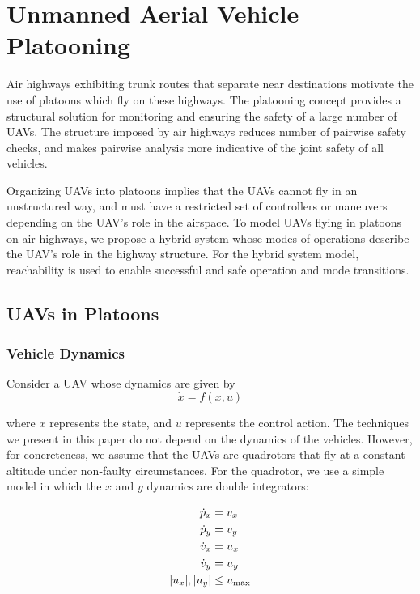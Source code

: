 \section{Unmanned Aerial Vehicle Platooning \label{sec:platooning}}
Air highways exhibiting trunk routes that separate near destinations motivate the use of platoons which fly on these highways. The platooning concept provides a structural solution for monitoring and ensuring the safety of a large number of UAVs. The structure imposed by air highways reduces number of pairwise safety checks, and makes pairwise analysis more indicative of the joint safety of all vehicles.

Organizing UAVs into platoons implies that the UAVs cannot fly in an unstructured way, and must have a restricted set of controllers or maneuvers depending on the UAV's role in the airspace. To model UAVs flying in platoons on air highways, we propose a hybrid system whose modes of operations describe the UAV's role in the highway structure. For the hybrid system model, reachability is used to enable successful and safe operation and mode transitions.

\subsection{UAVs in Platoons}
\subsubsection{Vehicle Dynamics}
Consider a UAV whose dynamics are given by
\begin{equation}
\dot{x} = f(x,u)
\end{equation}

\noindent where $x$ represents the state, and $u$ represents the control action. The techniques we present in this paper do not depend on the dynamics of the vehicles. However, for concreteness, we assume that the UAVs are quadrotors that fly at a constant altitude under non-faulty circumstances. For the quadrotor, we use a simple model in which the $x$ and $y$ dynamics are double integrators:

\begin{equation} \label{eq:dyn}
\begin{aligned}
\dot{p}_x &= v_x \\
\dot{p}_y &= v_y  \\
\dot{v}_x &= u_x \\
\dot{v}_y &= u_y \\
|u_x|,|u_y| &\le u_\text{max}
\end{aligned}
\end{equation}

